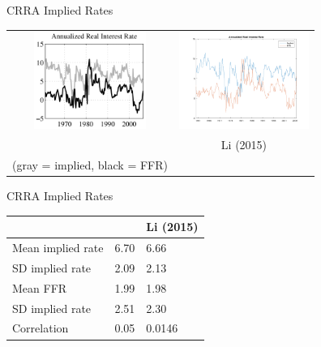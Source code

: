 \documentclass{beamer}
\begin{document}
\begin{frame}{CRRA Implied Rates}
\begin{center}
\begin{tabular}{cc}
\includegraphics[height=120px]{crra-real_collard.png} &
\includegraphics[height=120px]{crra-real.png} \\
\cite{collard11} & Li (2015) \\
(gray = implied, black = FFR) & 
\end{tabular}
\end{center}
\end{frame}

\begin{frame}{CRRA Implied Rates}
\begin{center}
\begin{tabular}{|l|l|l|} \hline
                  & \cite{collard11} & Li (2015) \\ \hline
Mean implied rate & 6.70             & 6.66      \\ \hline
SD implied rate   & 2.09             & 2.13      \\ \hline
Mean FFR          & 1.99             & 1.98      \\ \hline
SD implied rate   & 2.51             & 2.30      \\ \hline
Correlation       & 0.05             & 0.0146    \\ \hline
\end{tabular}
\end{center}
\end{frame}
\end{document}
